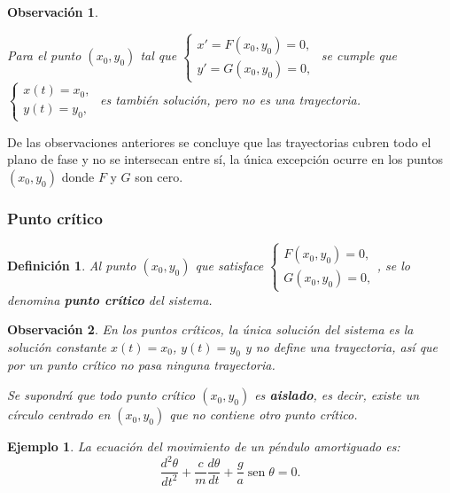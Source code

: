 \documentclass[a5paper,doc,10pt,noapacite]{apa6}
\DeclareMathOperator{\sen}{sen}
\newtheorem{definicion}{Definición}
\newtheorem{observ}{Observación}
\newtheorem{ejem}{Ejemplo}
\begin{document}
{{\begin{observ}
\begin{APAenumerate}
		\item Para el punto \((x_0,y_0)\) tal que
		\(
			\begin{cases}
			x' = F(x_0,y_0)=0,
			 \\
			y' = G(x_0,y_0)=0,
			\end{cases}
		\)\hspace{-1em}
		se cumple que 
		\(
			\begin{cases}
			x(t) = x_0,
			 \\
			y(t) = y_0,
			\end{cases}
		\)\hspace{-1em}
		es también solución, pero no es una  trayectoria.
		
		
	\end{APAenumerate}
\end{observ}

De las observaciones anteriores se concluye que las trayectorias cubren todo el plano de fase y no se intersecan entre sí, la única excepción ocurre en los puntos \((x_0,y_0)\) donde \(F\) y \(G\) son cero.



\subsubsection{Punto crítico}

\begin{definicion}
	Al punto \((x_0,y_0)\) que satisface \(\begin{cases}
			F(x_0,y_0)=0,
			 \\
			G(x_0,y_0)=0,
			\end{cases}
		\)\hspace{-1em}, se lo denomina \textbf{\emph{punto crítico}} del sistema.
\end{definicion}

\begin{observ}
	En los puntos críticos, la única solución del sistema es la solución constante \(x(t)=x_0\), \(y(t)=y_0\) y no define una trayectoria, así que por un punto crítico no pasa ninguna trayectoria.
	
	Se supondrá que todo punto crítico \((x_0,y_0)\) es \emph{\textbf{aislado}}, es decir, existe un círculo centrado en \((x_0,y_0)\)  que no contiene otro punto crítico.
\end{observ}

\begin{ejem}
	La ecuación del movimiento de un péndulo amortiguado es:
	\[
	\dfrac{d^2\theta}{dt^2}+\dfrac{c}{m}\dfrac{d\theta}{dt}+\dfrac{g}{a}\sen\theta=0.
	\]
	

\end{ejem}}}
\end{document}
